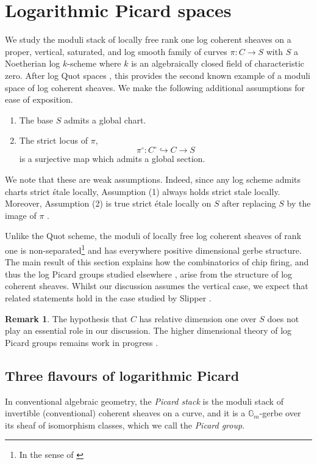 \documentclass[11pt]{amsart}
\theoremstyle{definition}
\theoremstyle{definition}
\newtheorem{remark}[theorem]{Remark}
\begin{document}
\section{Logarithmic Picard spaces}\label{section:log picard groups}
We study the moduli stack of locally free rank one log coherent sheaves on a proper, vertical, saturated, and log smooth family of curves $\pi \colon C\rightarrow S$ with $S$ a Noetherian log $k$-scheme where $k$ is an algebraically closed field of characteristic zero. 
After log Quot spaces \cite{kennedy2023logarithmic}, this provides the second known example of a moduli space of log coherent sheaves.
We make the following additional assumptions for ease of exposition. 
\begin{enumerate}
    \item The base $S$ admits a global chart. 
    \item The strict locus of $\pi$,
    $$\pi^\circ\colon C^\circ\hookrightarrow C \longrightarrow S$$ is a surjective map which admits a global section. 
\end{enumerate}
We note that these are weak assumptions. Indeed, since any log scheme admits charts strict \'stale locally,  Assumption (1) always holds strict stale locally. Moreover, Assumption (2) is true strict \'etale locally on $S$ after replacing $S$ by the image of $\pi$ \cite[055U]{stacks}.

Unlike the Quot scheme, the moduli of locally free log coherent sheaves of rank one is non-separated\footnote{In the sense of \cite[Example 2.2.5]{MolchoWise}} and has everywhere positive dimensional gerbe structure. The main result of this section explains how the combinatorics of chip firing, and thus the log Picard groups studied elsewhere \cite{MolchoWise, AaronLogPic}, arise from the structure of log coherent sheaves. Whilst our discussion assumes the vertical case, we expect that related statements hold in the case studied by Slipper \cite{AaronLogPic}. 

\begin{remark}
    The hypothesis that $C$ has relative dimension one over $S$ does not play an essential role in our discussion. The higher dimensional theory of log Picard groups remains work in progress \cite{LogPicHigherDim}. 
\end{remark}

\subsection{Three flavours of logarithmic Picard} 
    In conventional algebraic geometry, the \textit{Picard stack} is the moduli stack of invertible (conventional) coherent sheaves on a curve, and it is a $\mathbb{G}_m$-gerbe over its sheaf of isomorphism classes, which we call the \textit{Picard group}.
\end{document}
